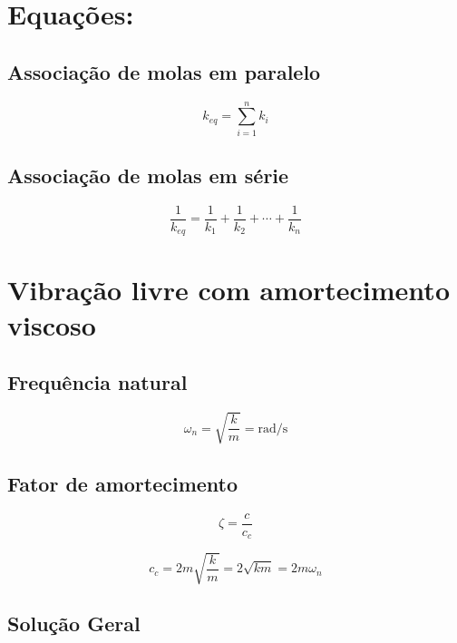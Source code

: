 \documentclass[a4paper,12pt]{article}
\begin{document}
\section{Equações:}%

\subsection{Associação de molas em paralelo}

\begin{equation}k_{e q}=\sum_{i=1}^{n} k_{i}\end{equation}

\subsection{Associação de molas em série}
\begin{equation}\frac{1}{k_{e q}}=\frac{1}{k_{1}}+\frac{1}{k_{2}}+\cdots+\frac{1}{k_{n}}\end{equation}

\section{Vibração livre com amortecimento viscoso}%
\label{sec:vibracao_livre_com_amortecimento_viscoso}

\subsection{Frequência natural}
\begin{equation}
    \omega_n = \sqrt{\frac{k}{m}} = \si{\radian\per\second}
\end{equation}

\subsection{Fator de amortecimento}%
\label{sub:fator_de_amortecimento}

\begin{equation}\label{eq:zeta}
\zeta=\frac{c}{c_{c}}
\end{equation}

\begin{equation}\label{eq:Cc}
c_{c}=2 m \sqrt{\frac{k}{m}}=2 \sqrt{k m}=2 m \omega_{n}
\end{equation}

\subsection{Solução Geral}%
\label{sub:solucao_geral}
\end{document}
